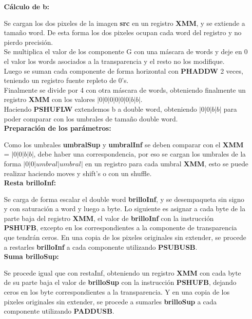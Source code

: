 {\centering\textbf{Cálculo de b:}}

Se cargan los dos pixeles de la imagen \textbf{src} en un registro \textbf{XMM}, y se extiende a tamaño word. De esta forma los dos pixeles ocupan cada word del registro y no pierdo precisión. \\
Se multiplica el valor de los componente G con una máscara de words y deje en 0 el valor los words asociados a la transparencia y el resto no los modifique. \\
Luego se suman cada componente de forma horizontal con \textbf{PHADDW} 2 veces, teniendo un registro fuente repleto de 0's. \\
Finalmente se divide por 4 con otra máscara de words, obteniendo finalmente un registro \textbf{XMM} con los valores $|0|0|0|0|0|0|b|b|$. \\
Haciendo \textbf{PSHUFLW} extendemos b a double word, obteniendo  $|0|0|b|b|$ para poder comparar con los umbrales de tamaño double word. \\

{\centering\textbf{Preparación de los parámetros:}}

Como los umbrales \textbf{umbralSup} y \textbf{umbralInf} se deben comparar con el \textbf{XMM} = $|0|0|b|b|$, debe haber una correspondencia, por eso se cargan los umbrales de la forma $|0|0|umbral|umbral|$ en un registro para cada umbral \textbf{XMM}, esto se puede realizar haciendo moves y shift's o con un shuffle. \\

{\centering\textbf{Resta brilloInf:}}

Se carga de forma escalar el double word \textbf{brilloInf}, y se desempaqueta sin signo y con saturación a word y luego a byte.
Lo siguiente es asignar a cada byte de la parte baja del registro \textbf{XMM}, el valor de \textbf{brilloInf} con la instrucción \textbf{PSHUFB}, excepto en los correspondientes a la componente de transparencia que tendrán ceros.
En una copia de los pixeles originales sin extender, se procede a restarles \textbf{brilloInf} a cada componente utilizando \textbf{PSUBUSB}. \\

{\centering\textbf{Suma brilloSup:}}

Se procede igual que con restaInf, obteniendo un registro \textbf{XMM} con cada byte de su parte baja el valor de \textbf{brilloSup} con la instrucción \textbf{PSHUFB}, dejando ceros en los byte correspondientes a la transparencia.
Y en una copia de los pixeles originales sin extender, se procede a sumarles \textbf{brilloSup} a cada componente utilizando \textbf{PADDUSB}. \\

